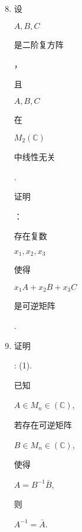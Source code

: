 \documentclass[10pt]{article}
\begin{document}
\begin{enumerate}
  \setcounter{enumi}{7}
  \item \begin{CJK}{UTF8}{mj}设\end{CJK} $A, B, C$ \begin{CJK}{UTF8}{mj}是二阶复方阵\end{CJK}，\begin{CJK}{UTF8}{mj}且\end{CJK} $A, B, C$ \begin{CJK}{UTF8}{mj}在\end{CJK} $M_{2}(\mathbb{C})$ \begin{CJK}{UTF8}{mj}中线性无关\end{CJK}. \begin{CJK}{UTF8}{mj}证明\end{CJK}：\begin{CJK}{UTF8}{mj}存在复数\end{CJK} $x_{1}, x_{2}, x_{3}$ \begin{CJK}{UTF8}{mj}使得\end{CJK} $x_{1} A+x_{2} B+x_{3} C$ \begin{CJK}{UTF8}{mj}是可逆矩阵\end{CJK}.

  \item \begin{CJK}{UTF8}{mj}证明\end{CJK}: (1). \begin{CJK}{UTF8}{mj}已知\end{CJK} $A \in M_{n} \in(\mathbb{C})$, \begin{CJK}{UTF8}{mj}若存在可逆矩阵\end{CJK} $B \in M_{n} \in(\mathbb{C})$, \begin{CJK}{UTF8}{mj}使得\end{CJK} $A=B^{-1} \bar{B}$, \begin{CJK}{UTF8}{mj}则\end{CJK} $A^{-1}=\bar{A}$.

\end{enumerate}
\end{document}
